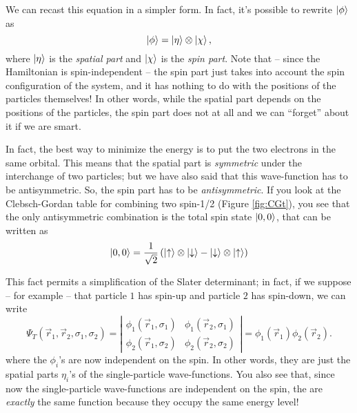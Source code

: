 We can recast this equation in a simpler form. In fact, it's possible to rewrite $\Ket{\phi}$ as
\begin{equation}
	\Ket{\phi} = \Ket{\eta} \otimes \Ket{\chi},
\end{equation}
where $\Ket{\eta}$ is the \emph{spatial part} and $\Ket{\chi}$ is the \emph{spin part}. Note that -- since the Hamiltonian is spin-independent -- the spin part just takes into account the spin configuration of the system, and it has nothing to do with the positions of the particles themselves! In other words, while the spatial part depends on the positions of the particles, the spin part does not at all and we can ``forget'' about it if we are smart. 

In fact, the best way to minimize the energy is to put the two electrons in the same orbital. This means that the spatial part is \emph{symmetric} under the interchange of two particles; but we have also said that this wave-function has to be antisymmetric. So, the spin part has to be \emph{antisymmetric}. If you look at the Clebsch-Gordan table for combining two spin-1/2 (Figure \ref{fig:CGt}), you see that the only antisymmetric combination is the total spin state $\Ket{0,0}$, that can be written as
\begin{equation}
	\Ket{0,0} 
	= \frac{1}{\sqrt{2}}
	 \left( \Ket{\uparrow} \otimes \Ket{\downarrow} 
	- \Ket{\downarrow} \otimes \Ket{\uparrow} \right)
	\label{eq:total_spin}
\end{equation}

This fact permits a simplification of the Slater determinant; in fact, if we suppose -- for example --  that particle $1$ has spin-up and particle $2$ has spin-down, we can write
\begin{equation}
	\Psi_T(\vec{r}_1,\vec{r}_2,\sigma_1,\sigma_2) 
	=\left\lvert
	\begin{array}{cc}
		\phi_1(\vec{r}_1,\sigma_1) & \phi_1(\vec{r}_2,\sigma_1) \\
		\phi_2(\vec{r}_1,\sigma_2) & \phi_2(\vec{r}_2,\sigma_2)
	\end{array}
	\right\lvert
	= \phi_1(\vec{r}_1)\phi_2(\vec{r}_2).
\end{equation}
where the $\phi_i$'s are now independent on the spin. In other words, they are just the spatial parts $\eta_i$'s of the single-particle wave-functions. You also see that, since now the single-particle wave-functions are independent on the spin, the are \emph{exactly} the same function because they occupy the same energy level!

